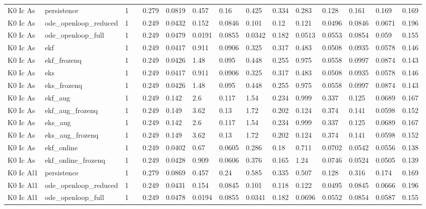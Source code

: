 \begin{table}[t]
\begin{tabular}{lllllllllllllll}
K0 Ic As & persistence & 1 &  & 0.279 & 0.0819 & 0.457 & 0.16 & 0.425 & 0.334 & 0.283 & 0.128 & 0.161 & 0.169 & 0.169 \\
K0 Ic As & ode\_openloop\_reduced & 1 &  & 0.249 & 0.0432 & 0.152 & 0.0846 & 0.101 & 0.12 & 0.121 & 0.0496 & 0.0846 & 0.0671 & 0.196 \\
K0 Ic As & ode\_openloop\_full & 1 &  & 0.249 & 0.0479 & 0.0191 & 0.0855 & 0.0342 & 0.182 & 0.0513 & 0.0553 & 0.0854 & 0.059 & 0.155 \\
K0 Ic As & ekf & 1 &  & 0.249 & 0.0417 & 0.911 & 0.0906 & 0.325 & 0.317 & 0.483 & 0.0508 & 0.0935 & 0.0578 & 0.146 \\
K0 Ic As & ekf\_frozenq & 1 &  & 0.249 & 0.0426 & 1.48 & 0.095 & 0.448 & 0.255 & 0.975 & 0.0558 & 0.0997 & 0.0874 & 0.143 \\
K0 Ic As & eks & 1 &  & 0.249 & 0.0417 & 0.911 & 0.0906 & 0.325 & 0.317 & 0.483 & 0.0508 & 0.0935 & 0.0578 & 0.146 \\
K0 Ic As & eks\_frozenq & 1 &  & 0.249 & 0.0426 & 1.48 & 0.095 & 0.448 & 0.255 & 0.975 & 0.0558 & 0.0997 & 0.0874 & 0.143 \\
K0 Ic As & ekf\_aug & 1 &  & 0.249 & 0.142 & 2.6 & 0.117 & 1.54 & 0.234 & 0.999 & 0.337 & 0.125 & 0.0689 & 0.167 \\
K0 Ic As & ekf\_aug\_frozenq & 1 &  & 0.249 & 0.149 & 3.62 & 0.13 & 1.72 & 0.202 & 0.124 & 0.374 & 0.141 & 0.0598 & 0.152 \\
K0 Ic As & eks\_aug & 1 &  & 0.249 & 0.142 & 2.6 & 0.117 & 1.54 & 0.234 & 0.999 & 0.337 & 0.125 & 0.0689 & 0.167 \\
K0 Ic As & eks\_aug\_frozenq & 1 &  & 0.249 & 0.149 & 3.62 & 0.13 & 1.72 & 0.202 & 0.124 & 0.374 & 0.141 & 0.0598 & 0.152 \\
K0 Ic As & ekf\_online & 1 &  & 0.249 & 0.0402 & 0.67 & 0.0605 & 0.286 & 0.18 & 0.711 & 0.0702 & 0.0542 & 0.0556 & 0.138 \\
K0 Ic As & ekf\_online\_frozenq & 1 &  & 0.249 & 0.0428 & 0.909 & 0.0606 & 0.376 & 0.165 & 1.24 & 0.0746 & 0.0524 & 0.0505 & 0.139 \\
K0 Ic Al1 & persistence & 1 &  & 0.279 & 0.0869 & 0.457 & 0.24 & 0.585 & 0.335 & 0.507 & 0.128 & 0.316 & 0.174 & 0.169 \\
K0 Ic Al1 & ode\_openloop\_reduced & 1 &  & 0.249 & 0.0431 & 0.154 & 0.0845 & 0.101 & 0.118 & 0.122 & 0.0495 & 0.0845 & 0.0666 & 0.196 \\
K0 Ic Al1 & ode\_openloop\_full & 1 &  & 0.249 & 0.0478 & 0.0194 & 0.0855 & 0.0341 & 0.182 & 0.0696 & 0.0552 & 0.0854 & 0.0587 & 0.155 \\

\end{tabular}
\end{table}
